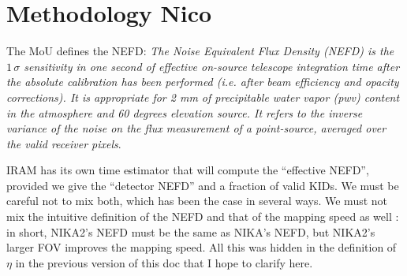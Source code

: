 


\section{Methodology {\color{blue} Nico}}

The MoU defines the NEFD:  \emph{The Noise Equivalent Flux Density (NEFD)
  is the $1\,\sigma$ sensitivity in one second of effective on-source telescope
  integration time after the absolute calibration has been performed (i.e. after
  beam efficiency and opacity corrections). It is appropriate for 2 mm of
  precipitable water vapor (pwv) content in the atmosphere and 60 degrees
  elevation source. It refers to the inverse variance of the noise on the flux
  measurement of a point-source, averaged over the valid receiver pixels}.

IRAM has its own time estimator that will compute the ``effective NEFD'',
provided we give the ``detector NEFD'' and a fraction of valid KIDs. We must be
careful not to mix both, which has been the case in several ways. We must not
mix the intuitive definition of the NEFD and that of the mapping speed as well :
in short, NIKA2's NEFD must be the same as NIKA's NEFD, but NIKA2's larger FOV
improves the mapping speed. All this was hidden in the definition of $\eta$ in
the previous version of this doc that I hope to clarify here.\\

